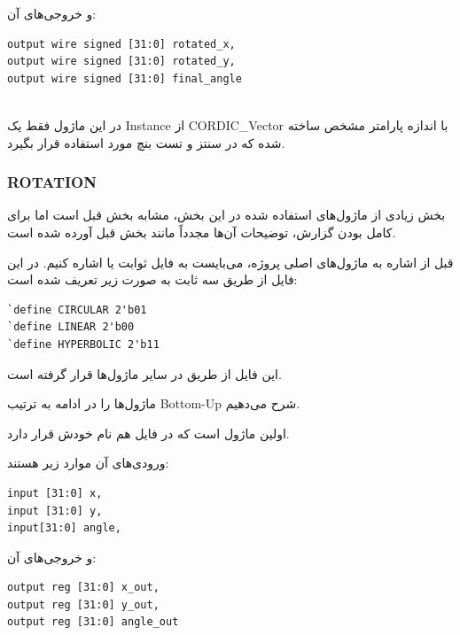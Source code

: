 \documentclass[12pt,titlepage,a4page , tikz , multi,table , svgnames,xcdraw]{article}
\begin{document}
و خروجی‌های آن:


\begin{latin}

\begin{verbatim}
output wire signed [31:0] rotated_x,
output wire signed [31:0] rotated_y,
output wire signed [31:0] final_angle
   
\end{verbatim}

\end{latin}

در این ماژول فقط یک Instance از CORDIC\_Vector با اندازه پارامتر مشخص ساخته شده که در سنتز و تست بنچ مورد استفاده قرار بگیرد.


\newpage
\subsubsection{ROTATION}
بخش زیادی از ماژول‌های استفاده شده در این بخش، مشابه بخش قبل است اما برای کامل بودن گزارش، توضیحات آن‌ها مجدداً مانند بخش قبل آورده شده است.




قبل از اشاره به ماژول‌های اصلی پروژه، می‌بایست به فایل ثوابت یا  اشاره کنیم. در این فایل از طریق  سه ثابت به صورت زیر تعریف شده است:
\begin{latin}
\begin{verbatim}
`define CIRCULAR 2'b01
`define LINEAR 2'b00
`define HYPERBOLIC 2'b11
\end{verbatim}
\end{latin}

این فایل از طریق  در سایر ماژول‌ها قرار گرفته است.

ماژول‌ها را در ادامه به ترتیب Bottom-Up شرح می‌دهیم.

اولین ماژول  است که در فایل هم نام خودش قرار دارد. 

 ورودی‌های آن موارد زیر هستند:

\begin{latin}
\begin{verbatim}
input [31:0] x,
input [31:0] y,
input[31:0] angle,
\end{verbatim}
\end{latin}

و خروجی‌های آن:

\begin{latin}
\begin{verbatim}
output reg [31:0] x_out,
output reg [31:0] y_out,
output reg [31:0] angle_out
\end{verbatim}
\end{latin}
\end{document}
